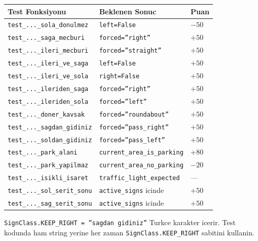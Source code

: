 \documentclass[a4paper,12pt]{article}
\begin{document}
\begin{center}
\renewcommand{\arraystretch}{1.15}
\begin{longtable}{p{5.5cm}ll}
  \toprule
  Test Fonksiyonu                        & Beklenen Sonuc            & Puan\\
  \midrule
  \endhead
  \texttt{test\_...\_sola\_donulmez}     & \texttt{left=False}       & $-50$\\
  \texttt{test\_...\_saga\_mecburi}      & \texttt{forced=''right''} & $+50$\\
  \texttt{test\_...\_ileri\_mecburi}     & \texttt{forced=''straight''}& $+50$\\
  \texttt{test\_...\_ileri\_ve\_saga}    & \texttt{left=False}       & $+50$\\
  \texttt{test\_...\_ileri\_ve\_sola}    & \texttt{right=False}      & $+50$\\
  \texttt{test\_...\_ileriden\_saga}     & \texttt{forced=''right''} & $+50$\\
  \texttt{test\_...\_ileriden\_sola}     & \texttt{forced=''left''}  & $+50$\\
  \texttt{test\_...\_doner\_kavsak}      & \texttt{forced=''roundabout''}& $+50$\\
  \texttt{test\_...\_sagdan\_gidiniz}    & \texttt{forced=''pass\_right''}& $+50$\\
  \texttt{test\_...\_soldan\_gidiniz}    & \texttt{forced=''pass\_left''}& $+50$\\
  \texttt{test\_...\_park\_alani}        & \texttt{current\_area\_is\_parking}& $+80$\\
  \texttt{test\_...\_park\_yapilmaz}     & \texttt{current\_area\_no\_parking}& $-20$\\
  \texttt{test\_...\_isikli\_isaret}     & \texttt{traffic\_light\_expected}& ---\\
  \texttt{test\_...\_sol\_serit\_sonu}   & \texttt{active\_signs} icinde & $+50$\\
  \texttt{test\_...\_sag\_serit\_sonu}   & \texttt{active\_signs} icinde & $+50$\\
  \bottomrule
\end{longtable}
\end{center}

\begin{notebox}
\texttt{SignClass.KEEP\_RIGHT = ''sagdan gidiniz''} Turkce karakter icerir.
Test kodunda ham string yerine her zaman \texttt{SignClass.KEEP\_RIGHT}
sabitini kullanin.
\end{notebox}
\end{document}
